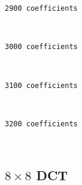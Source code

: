     \begin{Verbatim}[commandchars=\\\{\}]
2900 coefficients
    \end{Verbatim}

    \begin{center}
    \end{center}
    { \hspace*{\fill} \\}
    
    \begin{Verbatim}[commandchars=\\\{\}]
3000 coefficients
    \end{Verbatim}

    \begin{center}
    \end{center}
    { \hspace*{\fill} \\}
    
    \begin{Verbatim}[commandchars=\\\{\}]
3100 coefficients
    \end{Verbatim}

    \begin{center}
    \end{center}
    { \hspace*{\fill} \\}
    
    \begin{Verbatim}[commandchars=\\\{\}]
3200 coefficients
    \end{Verbatim}

    \begin{center}
    \end{center}
    { \hspace*{\fill} \\}
    
    \hypertarget{times-8-dct}{%
\subsection{\texorpdfstring{\(8\times 8\)
DCT}{8\textbackslash{}times 8 DCT}}\label{times-8-dct}}

